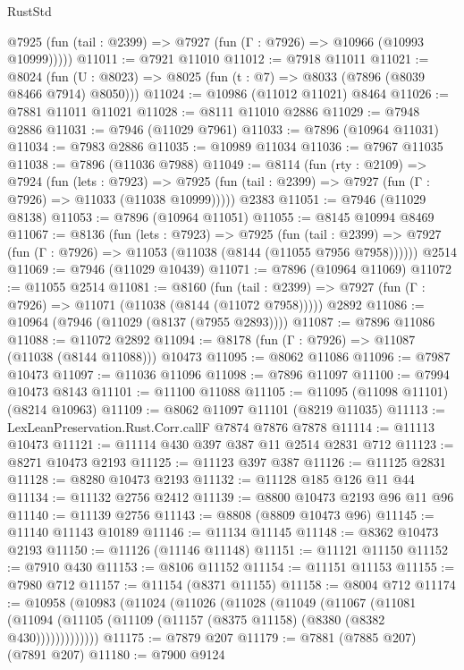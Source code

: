 \begin{lexlean}{RustStd}
\begin{coremodule}
      @7925 (fun (tail : @2399) => @7927 (fun (Γ : @7926) => @10966 (@10993 @10999)))))
@11011 := @7921 @11010
@11012 := @7918 @11011
@11021 := @8024 (fun (U : @8023) => @8025 (fun (t : @7) => @8033 (@7896 (@8039 @8466 @7914) @8050)))
@11024 := @10986 (@11012 @11021) @8464
@11026 := @7881 @11011 @11021
@11028 := @8111 @11010 @2886
@11029 := @7948 @2886
@11031 := @7946 (@11029 @7961)
@11033 := @7896 (@10964 @11031)
@11034 := @7983 @2886
@11035 := @10989 @11034
@11036 := @7967 @11035
@11038 := @7896 (@11036 @7988)
@11049 := @8114
    (fun (rty : @2109) =>
    @7924
      (fun (lets : @7923) =>
      @7925 (fun (tail : @2399) => @7927 (fun (Γ : @7926) => @11033 (@11038 @10999)))))
    @2383
@11051 := @7946 (@11029 @8138)
@11053 := @7896 (@10964 @11051)
@11055 := @8145 @10994 @8469
@11067 := @8136
    (fun (lets : @7923) =>
    @7925
      (fun (tail : @2399) =>
      @7927 (fun (Γ : @7926) => @11053 (@11038 (@8144 (@11055 @7956 @7958))))))
    @2514
@11069 := @7946 (@11029 @10439)
@11071 := @7896 (@10964 @11069)
@11072 := @11055 @2514
@11081 := @8160
    (fun (tail : @2399) => @7927 (fun (Γ : @7926) => @11071 (@11038 (@8144 (@11072 @7958)))))
    @2892
@11086 := @10964 (@7946 (@11029 (@8137 (@7955 @2893))))
@11087 := @7896 @11086
@11088 := @11072 @2892
@11094 := @8178 (fun (Γ : @7926) => @11087 (@11038 (@8144 @11088))) @10473
@11095 := @8062 @11086
@11096 := @7987 @10473
@11097 := @11036 @11096
@11098 := @7896 @11097
@11100 := @7994 @10473 @8143
@11101 := @11100 @11088
@11105 := @11095 (@11098 @11101) (@8214 @10963)
@11109 := @8062 @11097 @11101 (@8219 @11035)
@11113 := LexLeanPreservation.Rust.Corr.callF @7874 @7876 @7878
@11114 := @11113 @10473
@11121 := @11114 @430 @397 @387 @11 @2514 @2831 @712
@11123 := @8271 @10473 @2193
@11125 := @11123 @397 @387
@11126 := @11125 @2831
@11128 := @8280 @10473 @2193
@11132 := @11128 @185 @126 @11 @44
@11134 := @11132 @2756 @2412
@11139 := @8800 @10473 @2193 @96 @11 @96
@11140 := @11139 @2756
@11143 := @8808 (@8809 @10473 @96)
@11145 := @11140 @11143 @10189
@11146 := @11134 @11145
@11148 := @8362 @10473 @2193
@11150 := @11126 (@11146 @11148)
@11151 := @11121 @11150
@11152 := @7910 @430
@11153 := @8106 @11152
@11154 := @11151 @11153
@11155 := @7980 @712
@11157 := @11154 (@8371 @11155)
@11158 := @8004 @712
@11174 := @10958
    (@10983
      (@11024
        (@11026
          (@11028
            (@11049
              (@11067
                (@11081
                  (@11094 (@11105 (@11109 (@11157 (@8375 @11158) (@8380 (@8382 @430)))))))))))))
@11175 := @7879 @207
@11179 := @7881 (@7885 @207) (@7891 @207)
@11180 := @7900 @9124

\end{coremodule}
\end{lexlean}
